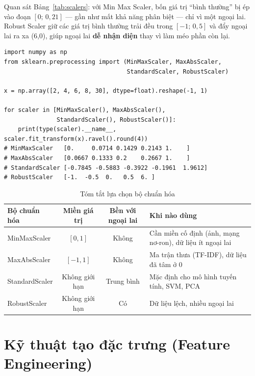 Quan sát Bảng~\ref{tab:scalers}: với Min Max Scaler, bốn giá trị ``bình thường'' bị ép vào đoạn $[0;\,0{,}21]$ --- gần như mất khả năng phân biệt --- chỉ vì một ngoại lai. Robust Scaler giữ các giá trị bình thường trải đều trong $[-1;\,0{,}5]$ và đẩy ngoại lai ra xa (6,0), giúp ngoại lai \textbf{dễ nhận diện} thay vì làm méo phần còn lại.

\begin{lstlisting}[caption={So sánh bốn bộ chuẩn hóa trong scikit-learn}]
import numpy as np
from sklearn.preprocessing import (MinMaxScaler, MaxAbsScaler,
                                   StandardScaler, RobustScaler)

x = np.array([2, 4, 6, 8, 30], dtype=float).reshape(-1, 1)

for scaler in [MinMaxScaler(), MaxAbsScaler(),
               StandardScaler(), RobustScaler()]:
    print(type(scaler).__name__, scaler.fit_transform(x).ravel().round(4))
# MinMaxScaler   [0.     0.0714 0.1429 0.2143 1.    ]
# MaxAbsScaler   [0.0667 0.1333 0.2    0.2667 1.    ]
# StandardScaler [-0.7845 -0.5883 -0.3922 -0.1961  1.9612]
# RobustScaler   [-1.  -0.5  0.   0.5  6. ]
\end{lstlisting}


\begin{table}[H]
\centering
\begin{tabular}{|l|c|c|p{5.2cm}|}
\hline
\textbf{Bộ chuẩn hóa} & \textbf{Miền giá trị} & \textbf{Bền với ngoại lai} & \textbf{Khi nào dùng} \\
\hline
MinMaxScaler & $[0, 1]$ & Không & Cần miền cố định (ảnh, mạng nơ-ron), dữ liệu ít ngoại lai \\ \hline
MaxAbsScaler & $[-1, 1]$ & Không & Ma trận thưa (TF-IDF), dữ liệu đã tâm ở 0 \\ \hline
StandardScaler & Không giới hạn & Trung bình & Mặc định cho mô hình tuyến tính, SVM, PCA \\ \hline
RobustScaler & Không giới hạn & Có & Dữ liệu lệch, nhiều ngoại lai \\ \hline
\end{tabular}
\caption{Tóm tắt lựa chọn bộ chuẩn hóa}
\end{table}

\section{Kỹ thuật tạo đặc trưng (Feature Engineering)}
\label{sec:feature-eng}

